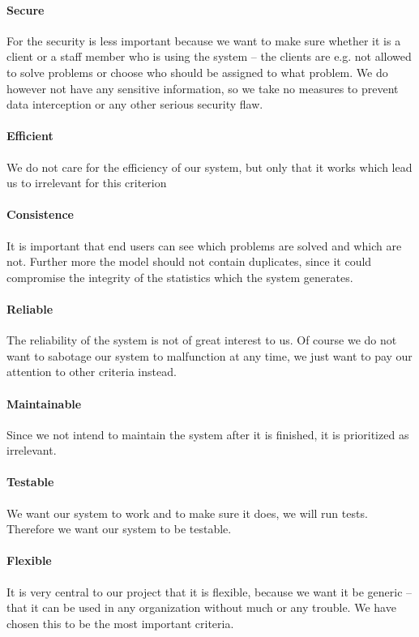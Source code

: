 \paragraph{Secure}
For the \hdesk[] security is less important because we want to make sure whether it is a client or a staff member who is using the system -- the clients are e.g. not allowed to solve problems or choose who should be assigned to what problem.
We do however not have any sensitive information, so we take no measures to prevent data interception or any other serious security flaw.
\paragraph{Efficient}
We do not care for the efficiency of our system, but only that it works which lead us to irrelevant for this criterion 
\paragraph{Consistence}
It is important that end users can see which problems are solved and which are not.
Further more the \hdesk[] model should not contain duplicates, since it could compromise the integrity of the statistics which the system generates. 
\paragraph{Reliable}
The reliability of the \hdesk[] system is not of great interest to us.
Of course we do not want to sabotage our system to malfunction at any time, we just want to pay our attention to other criteria instead.
\paragraph{Maintainable}
Since we not intend to maintain the system after it is finished, it is prioritized as irrelevant.
\paragraph{Testable}
We want our system to work and to make sure it does, we will run tests.
Therefore we want our system to be testable.
\paragraph{Flexible}
It is very central to our project that it is flexible, because we want it be generic -- that it can be used in any organization without much or any trouble.
We have chosen this to be the most important criteria.
